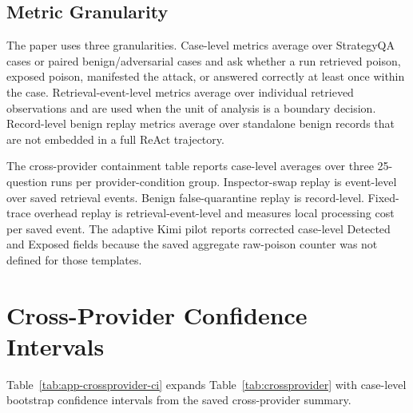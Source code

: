 \documentclass[11pt]{article}
\begin{document}
\subsection{Metric Granularity}
\label{app:metric-granularity}

The paper uses three granularities. Case-level metrics average over StrategyQA cases or paired benign/adversarial cases and ask whether a run retrieved poison, exposed poison, manifested the attack, or answered correctly at least once within the case. Retrieval-event-level metrics average over individual retrieved observations and are used when the unit of analysis is a boundary decision. Record-level benign replay metrics average over standalone benign records that are not embedded in a full ReAct trajectory.

The cross-provider containment table reports case-level averages over three 25-question runs per provider-condition group. Inspector-swap replay is event-level over saved retrieval events. Benign false-quarantine replay is record-level. Fixed-trace overhead replay is retrieval-event-level and measures local processing cost per saved event. The adaptive Kimi pilot reports corrected case-level Detected and Exposed fields because the saved aggregate raw-poison counter was not defined for those templates.

\section{Cross-Provider Confidence Intervals}
\label{app:ci}

Table~\ref{tab:app-crossprovider-ci} expands Table~\ref{tab:crossprovider} with case-level bootstrap confidence intervals from the saved cross-provider summary.
\end{document}
